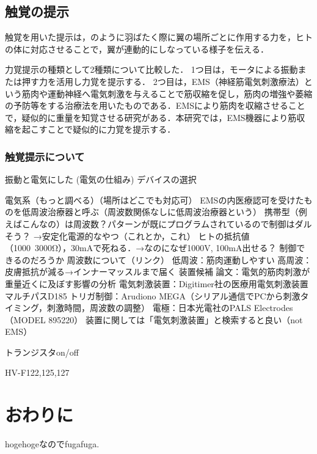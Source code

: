     
    \subsection{触覚の提示}

        触覚を用いた提示は，のように羽ばたく際に翼の場所ごとに作用する力を，ヒトの体に対応させることで，翼が連動的にしなっている様子を伝える．

        力覚提示の種類として2種類について比較した．
        1つ目は，モータによる振動または押す力を活用し力覚を提示する．
        2つ目は，EMS（神経筋電気刺激療法）という筋肉や運動神経へ電気刺激を与えることで筋収縮を促し，筋肉の増強や萎縮の予防等をする治療法を用いたものである．EMSにより筋肉を収縮させることで，疑似的に重量を知覚させる研究がある\cite{小川剛史2017電気的筋肉刺激が重量知覚に及ぼす影響の分析}．本研究では，EMS機器により筋収縮を起こすことで疑似的に力覚を提示する．

        \subsubsection{触覚提示について}
        振動と電気にした
        (電気の仕組み)
        デバイスの選択

            電気系（もっと調べる）（場所はどこでも対応可）
        EMSの内医療認可を受けたものを低周波治療器と呼ぶ（周波数関係なしに低周波治療器という）
        携帯型（例えばこんなの）は周波数？パターンが既にプログラムされているので制御はダルそう？
        →安定化電源的なやつ（これとか，これ）
        ヒトの抵抗値（1000~3000Ω），30mAで死ねる．→なのになぜ1000V, 100mA出せる？
        制御できるのだろうか
        周波数について（リンク）
        低周波：筋肉運動しやすい
        高周波：皮膚抵抗が減る→インナーマッスルまで届く
        装置候補
        論文：電気的筋肉刺激が重量近くに及ぼす影響の分析
        電気刺激装置：Digitimer社の医療用電気刺激装置マルチパスD185
        トリガ制御：Arudiono MEGA（シリアル通信でPCから刺激タイミング，刺激時間，周波数の調整）
        電極：日本光電社のPALS Electrodes（MODEL 895220）
        装置に関しては「電気刺激装置」と検索すると良い（not EMS）


        トランジスタon/off

        HV-F122,125,127
        
\section{おわりに}
    hogehogeなのでfugafuga.